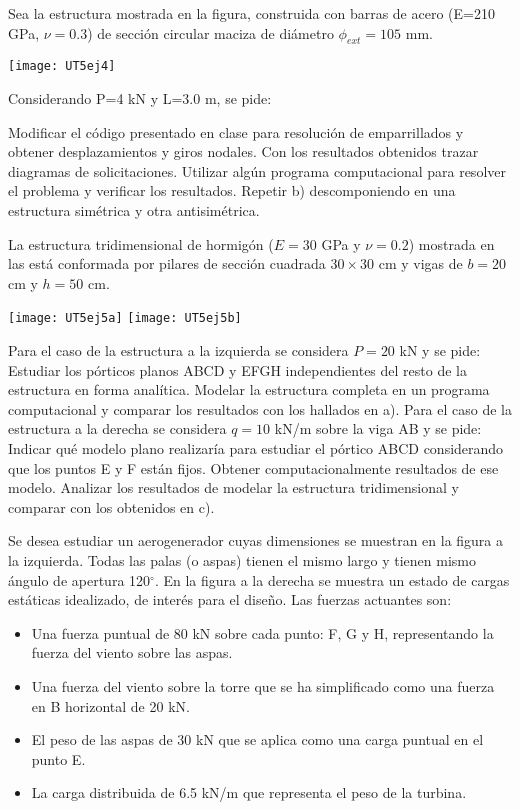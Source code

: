 \ejercicio

Sea la estructura mostrada en la figura, construida con barras de acero (E=210 GPa, $\nu=0.3$) de sección circular maciza de diámetro $\phi_{ext}=105$ mm. 

\begin{center}
	\texttt{[image: UT5ej4]}
\end{center}

Considerando P=4 kN y L=3.0 m, se pide:

\parte Modificar el código presentado en clase para resolución de emparrillados y obtener desplazamientos y giros nodales. Con los resultados obtenidos trazar diagramas de solicitaciones.
\parte Utilizar algún programa computacional para resolver el problema y verificar los resultados.
\parte Repetir b) descomponiendo en una estructura simétrica y otra antisimétrica.




\ejercicio

La estructura tridimensional de hormigón ($E=30$ GPa y $\nu=0.2$) mostrada en las está conformada por pilares de sección cuadrada $30 \times 30$ cm y vigas de $b=20$ cm y  $h=50$ cm.

\begin{center}
	\texttt{[image: UT5ej5a]}
	\hspace{0.05\linewidth}
	\texttt{[image: UT5ej5b]}
\end{center}

Para el caso de la estructura a la izquierda se considera $P=20$ kN y se pide:
%
\parte Estudiar los pórticos planos ABCD y EFGH independientes del resto de la estructura en forma analítica. 
%
\parte Modelar la estructura completa en un programa computacional y comparar  los resultados con los hallados en a). %
%
Para el caso de la estructura a la derecha se considera $q=10$ kN/m sobre la viga AB y se pide:
%
\parte Indicar qué modelo plano realizaría para estudiar el pórtico ABCD considerando que los puntos E y F están fijos. Obtener computacionalmente resultados de ese modelo. 
%
\parte Analizar los resultados de modelar la estructura tridimensional y comparar con los obtenidos en c). 

\ejercicio

Se desea estudiar un aerogenerador cuyas dimensiones se muestran en la figura a la izquierda. Todas las palas (o aspas) tienen el mismo largo y tienen mismo ángulo de apertura 120$^\circ$. %
%
%
En la figura a la derecha se muestra un estado de cargas estáticas idealizado, de interés para el diseño. %
%
Las fuerzas actuantes son:
\begin{itemize}
\item Una fuerza puntual de 80 kN sobre cada punto: F, G y H, representando la fuerza del viento sobre las aspas. 
\item Una fuerza del viento sobre la torre que se ha simplificado como una fuerza en B horizontal de 20 kN. 
\item El peso de las aspas de 30 kN que se aplica como una carga puntual en el punto E.
\item La carga distribuida de 6.5 kN/m que representa el peso de la turbina.
\end{itemize}

